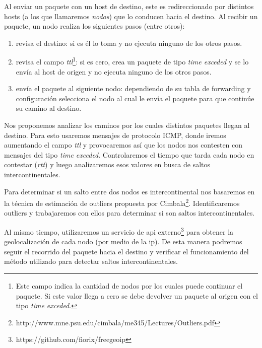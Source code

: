 \par Al enviar un paquete con un host de destino, este es redireccionado por distintos hosts (a los que llamaremos \textit{nodos}) que lo conducen hacia el destino. Al recibir un paquete, un nodo realiza los siguientes pasos (entre otros):
\begin{enumerate}
  \item revisa el destino: si es él lo toma y no ejecuta ninguno de los otros pasos.
  \item revisa el campo \textit{ttl}\footnote{Este campo indica la cantidad de nodos por los cuales puede continuar el paquete. Si este valor llega a cero se debe devolver un paquete al origen con el tipo \textit{time exceded}.}: si es cero, crea un paquete de tipo \textit{time exceded} y se lo envía al host de origen y no ejecuta ninguno de los otros pasos.
  \item envía el paquete al siguiente nodo: dependiendo de su tabla de forwarding y configuración selecciona el nodo al cual le envía el paquete para que continúe su camino al destino.
\end{enumerate}
\par Nos proponemos analizar los caminos por los cuales distintos paquetes llegan al destino. Para esto usaremos mensajes de protocolo ICMP, donde iremos aumentando el campo \textit{ttl} y provocaremos así que los nodos nos contesten con mensajes del tipo \textit{time exceded}. Controlaremos el tiempo que tarda cada nodo en contestar (\textit{rtt}) y luego analizaremos esos valores en busca de saltos intercontinentales.
\par Para determinar si un salto entre dos nodos es intercontinental nos basaremos en la técnica de estimación de outliers propuesta por Cimbala\footnote{http://www.mne.psu.edu/cimbala/me345/Lectures/Outliers.pdf}. Identificaremos outliers y trabajaremos con ellos para determinar si son saltos intercontinentales.
\par Al mismo tiempo, utilizaremos un servicio de api externo\footnote{https://github.com/fiorix/freegeoip} para obtener la geolocalización de cada nodo (por medio de la ip). De esta manera podremos seguir el recorrido del paquete hacia el destino y verificar el funcionamiento del método utilizado para detectar saltos intercontinentales.
